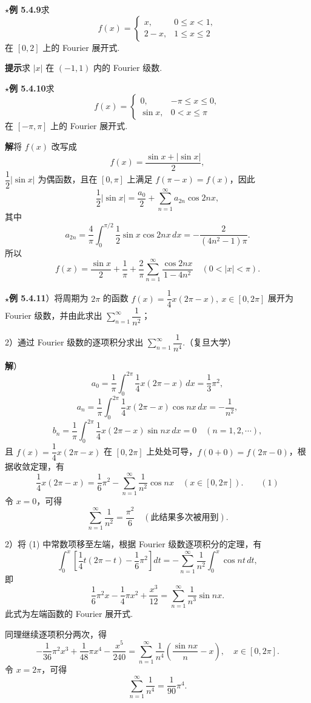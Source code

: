 \documentclass[UTF8,12pt,a4paper,fontset=fandol]{ctexart}
\begin{document}
\noindent\(\star\)\textbf{例 5.4.9}\quad 求
\[
  f(x)=
  \begin{cases}
  x,&0\le x<1,\\
  2-x,&1\le x\le2
  \end{cases}
\]
在 $[0,2]$ 上的 Fourier 展开式.

\noindent\textbf{提示}\quad 求 $|x|$ 在 $(-1,1)$ 内的 Fourier 级数.

\noindent\(\star\)\textbf{例 5.4.10}\quad 求
\[
  f(x)=
  \begin{cases}
  0,&-\pi\le x\le0,\\
  \sin x,&0<x\le\pi
  \end{cases}
\]
在 $[-\pi,\pi]$ 上的 Fourier 展开式.

\noindent\textbf{解}\quad 将 $f(x)$ 改写成
\[
  f(x)=\frac{\sin x+|\sin x|}{2},
\]
$\dfrac12|\sin x|$ 为偶函数，且在 $[0,\pi]$ 上满足 $f(\pi-x)=f(x)$，因此
\[
  \frac12|\sin x|=\frac{a_0}2+\sum_{n=1}^{\infty}a_{2n}\cos2nx,
\]
其中
\[
  a_{2n}=\frac4\pi\int_0^{\pi/2}\frac12\sin x\cos2nx\,dx
  =-\frac2{(4n^2-1)\pi}.
\]
所以
\[
  f(x)=\frac{\sin x}{2}+\frac1\pi+\frac2\pi
  \sum_{n=1}^{\infty}\frac{\cos2nx}{1-4n^2}\quad(0<|x|<\pi).
\]

\noindent\(\star\)\textbf{例 5.4.11}）将周期为 $2\pi$ 的函数 $f(x)=\dfrac14x(2\pi-x),\ x\in[0,2\pi]$ 展开为 Fourier 级数，并由此求出 $\displaystyle\sum_{n=1}^{\infty}\dfrac1{n^2}$；

2）通过 Fourier 级数的逐项积分求出 $\displaystyle\sum_{n=1}^{\infty}\dfrac1{n^4}$.（复旦大学）

\noindent\textbf{解}）
\[
  a_0=\frac1\pi\int_0^{2\pi}\frac14x(2\pi-x)\,dx=\frac13\pi^2,
\]
\[
  a_n=\frac1\pi\int_0^{2\pi}\frac14x(2\pi-x)\cos nx\,dx=-\frac1{n^2},
\]
\[
  b_n=\frac1\pi\int_0^{2\pi}\frac14x(2\pi-x)\sin nx\,dx=0\quad(n=1,2,\cdots),
\]
且 $f(x)=\dfrac14x(2\pi-x)$ 在 $[0,2\pi]$ 上处处可导，$f(0+0)=f(2\pi-0)$，根据收敛定理，有
\[
  \frac14x(2\pi-x)=\frac16\pi^2-\sum_{n=1}^{\infty}\frac1{n^2}\cos nx\quad(x\in[0,2\pi]). \qquad(1)
\]
令 $x=0$，可得
\[
  \sum_{n=1}^{\infty}\frac1{n^2}=\frac{\pi^2}{6}\quad(\text{此结果多次被用到}).
\]

2）将 (1) 中常数项移至左端，根据 Fourier 级数逐项积分的定理，有
\[
  \int_0^x\left[\frac14t(2\pi-t)-\frac16\pi^2\right]dt
  =-\sum_{n=1}^{\infty}\frac1{n^2}\int_0^x\cos nt\,dt,
\]
即
\[
  \frac16\pi^2x-\frac14\pi x^2+\frac{x^3}{12}
  =\sum_{n=1}^{\infty}\frac1{n^3}\sin nx.
\]
此式为左端函数的 Fourier 展开式.

同理继续逐项积分两次，得
\[
  -\frac1{36}\pi^2x^3+\frac1{48}\pi x^4-\frac{x^5}{240}
  =\sum_{n=1}^{\infty}\frac1{n^4}\left(\frac{\sin nx}{n}-x\right),\quad x\in[0,2\pi].
\]
令 $x=2\pi$，可得
\[
  \sum_{n=1}^{\infty}\frac1{n^4}=\frac1{90}\pi^4.
\]
\end{document}
